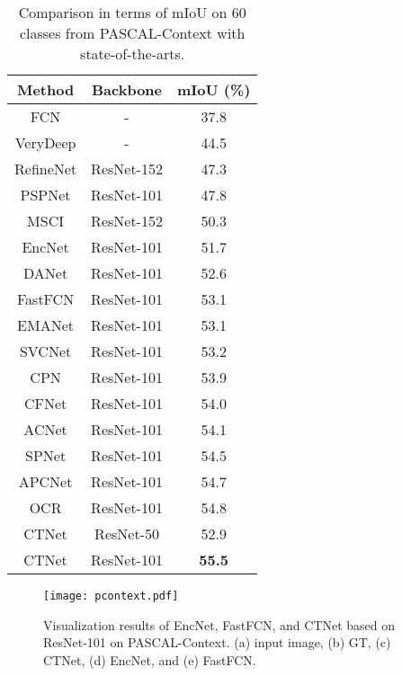 \documentclass[10pt,journal,cspaper,compsoc]{IEEEtran}
\begin{document}
	
\begin{table}[!t]
\caption{Comparison in terms of mIoU on 60 classes from PASCAL-Context with state-of-the-arts.}
		\label{table7}
		\renewcommand\arraystretch{1.3}
		\centering
		\begin{tabular}{c|c|c}
			\hline
			Method &Backbone  & mIoU (\%)\\
			\hline
			FCN \cite{shelhamer2017fully}   & -  &   37.8\\
			VeryDeep \cite{wang2017learning} & - & 44.5\\
			RefineNet \cite{lin2017refinenet} & ResNet-152& 47.3\\
			PSPNet \cite{zhao2017pyramid} & ResNet-101& 47.8\\
			MSCI \cite{lin2018multi} & ResNet-152& 50.3\\
			EncNet \cite{zhang2018context}& ResNet-101& 51.7\\
			DANet \cite{fu2019dual}& ResNet-101& 52.6\\
			FastFCN \cite{wu2019fastfcn}& ResNet-101& 53.1\\
			EMANet \cite{li2019expectation}& ResNet-101& 53.1\\
			SVCNet \cite{ding2019semantic} & ResNet-101& 53.2\\
			CPN \cite{yu2020context}& ResNet-101&53.9\\
			CFNet \cite{zhang2019co}& ResNet-101& 54.0\\
			ACNet \cite{ding2019acnet} & ResNet-101& 54.1\\
			SPNet \cite{hou2020strip}& ResNet-101& 54.5\\
			APCNet \cite{he2019adaptive}& ResNet-101& 54.7\\
			OCR \cite{yuan2020object}& ResNet-101& 54.8\\
			\hline
			CTNet & ResNet-50&52.9\\
			CTNet & ResNet-101& \textbf{55.5}\\
			\hline
		\end{tabular}
\end{table}

\begin{figure}
		\centering
		\texttt{[image: pcontext.pdf]}
		\caption{Visualization results of EncNet, FastFCN, and CTNet based on ResNet-101 on PASCAL-Context. (a) input image, (b) GT, (c) CTNet, (d) EncNet, and (e) FastFCN.}
		\label{fig12}
\vspace{-4mm}
\end{figure}
	
\end{document}
